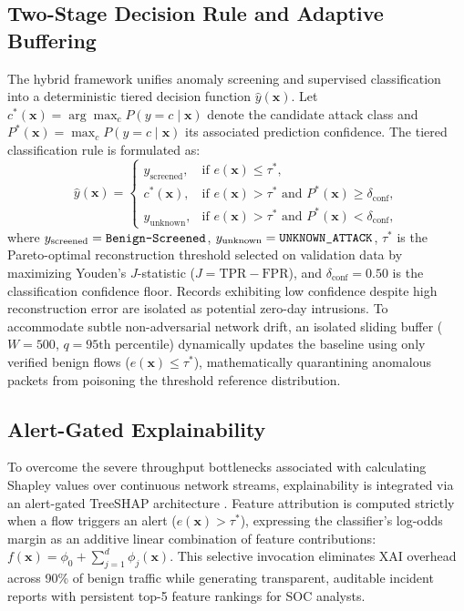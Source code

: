 \documentclass[journal]{IEEEtran}
\begin{document}
\subsection{Two-Stage Decision Rule and Adaptive Buffering}
The hybrid framework unifies anomaly screening and supervised classification into a deterministic tiered decision function $\hat{y}(\mathbf{x})$. Let $c^*(\mathbf{x}) = \arg\max_c P(y = c \mid \mathbf{x})$ denote the candidate attack class and $P^*(\mathbf{x}) = \max_c P(y = c \mid \mathbf{x})$ its associated prediction confidence. The tiered classification rule is formulated as:
\begin{equation}
\hat{y}(\mathbf{x}) = 
\begin{cases}
y_{\text{screened}}, & \text{if } e(\mathbf{x}) \le \tau^*,\\[3pt]
c^*(\mathbf{x}), & \text{if } e(\mathbf{x}) > \tau^* \text{ and } P^*(\mathbf{x}) \ge \delta_{\text{conf}},\\[3pt]
y_{\text{unknown}}, & \text{if } e(\mathbf{x}) > \tau^* \text{ and } P^*(\mathbf{x}) < \delta_{\text{conf}},
\end{cases}
\end{equation}
where $y_{\text{screened}} = \text{\texttt{Benign-Screened}}$, $y_{\text{unknown}} = \text{\texttt{UNKNOWN\_ATTACK}}$, $\tau^*$ is the Pareto-optimal reconstruction threshold selected on validation data by maximizing Youden's $J$-statistic ($J = \text{TPR} - \text{FPR}$), and $\delta_{\text{conf}} = 0.50$ is the classification confidence floor. Records exhibiting low confidence despite high reconstruction error are isolated as potential zero-day intrusions. To accommodate subtle non-adversarial network drift, an isolated sliding buffer ($W = 500$, $q = 95\text{th percentile}$) dynamically updates the baseline using only verified benign flows ($e(\mathbf{x}) \le \tau^*$), mathematically quarantining anomalous packets from poisoning the threshold reference distribution.

\subsection{Alert-Gated Explainability}
To overcome the severe throughput bottlenecks associated with calculating Shapley values over continuous network streams, explainability is integrated via an alert-gated TreeSHAP architecture \cite{neupane2022,mahmoud2025}. Feature attribution is computed strictly when a flow triggers an alert ($e(\mathbf{x}) > \tau^*$), expressing the classifier's log-odds margin as an additive linear combination of feature contributions: $f(\mathbf{x}) = \phi_0 + \sum_{j=1}^d \phi_j(\mathbf{x})$. This selective invocation eliminates XAI overhead across 90\% of benign traffic while generating transparent, auditable incident reports with persistent top-5 feature rankings for SOC analysts.
\end{document}
